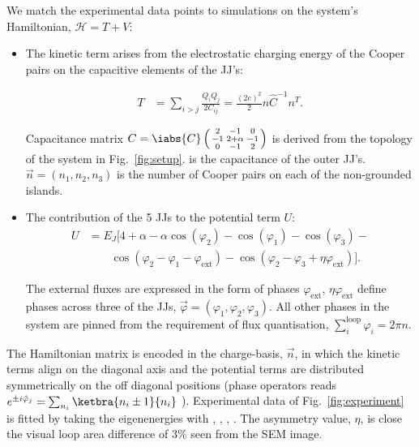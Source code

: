 \noindent We match the experimental data points to simulations on the system's Hamiltonian, $ \mathcal{H} = T + V $:
\begin{itemize}
	
\item The kinetic term arises from the electrostatic charging energy of the Cooper pairs on the capacitive elements of the JJ's:
	
  \begin{equation}\label{eq:kinetic}
    \begin{aligned}
      T & = \sum_{i>j}\frac{Q_iQ_j}{2C_{ij}} = \frac{(2e)^2}{2}n\hat{C}^{-1}n^{T}.
    \end{aligned}
  \end{equation}
	
  \noindent Capacitance matrix
  $ C=\iabs{C}\left(\begin{smallmatrix} 2 & -1 & 0\\ -1 & 2 + \alpha & -1\\
      0 & -1 & 2 \end{smallmatrix}\right)$ is derived from the topology of the system in Fig.~\ref{fig:setup}.  is the
  capacitance of the outer JJ's.  $ \vec{n} = (n_1, n_2, n_3) $ is the number of Cooper pairs on each of the non-grounded islands.
	
\item The contribution of the 5 JJs to the potential term $ U $:
  \begin{equation}\label{eq:potential}
    \begin{aligned}
      U & = E_J\big[4 + \alpha - \alpha\cos(\varphi_{2}) -\cos(\varphi_{1}) -\cos(\varphi_{3}) - \\ & \qquad \cos(\varphi_{2} - \varphi_{1} - \varphi_{\text{ext}}) - \cos(\varphi_{2} -
      \varphi_{3} + \eta\varphi_{\text{ext}})\big].
    \end{aligned}
  \end{equation}
	
  \noindent The external fluxes are expressed in the form of phases $ \varphi_\text{ext} $, $ \eta\varphi_\text{ext} $ define phases across three
  of the JJs, $ \vec{\varphi} = (\varphi_1, \varphi_2, \varphi_3) $. All other phases in the system are pinned from the requirement of flux quantisation,
  $ \sum_i^{\text{loop}} \varphi_i = 2\pi n $.
\end{itemize}

\noindent The Hamiltonian matrix is encoded in the charge-basis, $\vec{n} $, in which the kinetic terms align on the diagonal axis
and the potential terms are distributed symmetrically on the off diagonal positions (phase operators reads
$ e^{\pm i\hat{\varphi}_j} = \sum_{n_i}\ketbra{n_i\pm1}{n_i}$ \cite{phase}). Experimental data of Fig.~\ref{fig:experiment} is fitted by
taking the eigenenergies with , , , . The
asymmetry value, $ \eta $, is close the visual loop area difference of 3\% seen from the SEM image.
 
